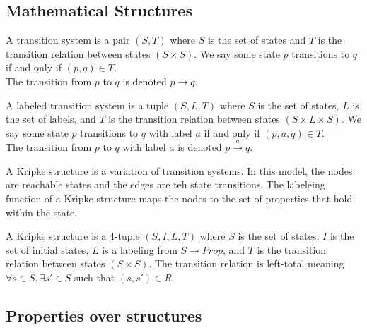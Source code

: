 \subsection{Mathematical Structures}



\begin{definition}
    A transition system is a pair $(S,T)$ where $S$ is the set of states and $T$ is the transition relation between states $ ( S \times S )$. We say some state $p$ transitions to $q$ if and only if $(p,q) \in T$. \\ The transition from $p$ to $q$ is denoted $ p \rightarrow q $.
\end{definition}


\begin{definition}
    A labeled transition system is a tuple $(S, L, T)$ where $S$ is the set of states, $L$ is the set of labels, and $T$ is the transition relation between states $ ( S \times L \times S )$. We say some state $p$ transitions to $q$ with label $a$ if and only if $(p,a,q) \in T$. \\ The transition from $p$ to $q$ with label $a$ is denoted $ p \xrightarrow{a} q $.
\end{definition}

A Kripke structure is a variation of transition systems. In this model, the nodes are reachable states and the edges are teh state transitions. The labeleing function of a Kripke structure maps the nodes to the set of properties that hold within the state. 

\begin{definition}
    A Kripke structure is a 4-tuple $(S, I, L, T)$ where $S$ is the set of states, $I$ is the set of initial states, $L$ is a labeling from $S \rightarrow Prop$,  and $T$ is the transition relation between states $ ( S \times S )$. The transition relation is left-total meaning $\forall s \in S, \exists s' \in S$ such that $(s,s') \in R$ 
    
\end{definition}

\subsection{Properties over structures}

